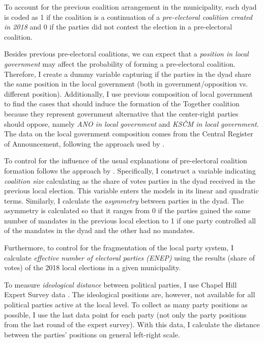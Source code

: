 \documentclass[]{interact}
\theoremstyle{plain}%
\theoremstyle{definition}
\theoremstyle{remark}
\begin{document}
To account for the previous coalition arrangement in the municipality, each dyad is coded as 1 if the coalition is a continuation of a \emph{pre-electoral coalition created in 2018} and 0 if the parties did not contest the election in a pre-electoral coalition. 

Besides previous pre-electoral coalitions, we can expect that a \emph{position in local government} may affect the probability of forming a pre-electoral coalition. Therefore, I create a dummy variable capturing if the parties in the dyad share the same position in the local government (both in government/opposition vs. different position). Additionally, I use previous composition of local government to find the cases that should induce the formation of the Together coalition because they represent government alternative that the center-right parties should oppose, namely \emph{ANO in local government} and \emph{KSČM in local government}. 
The data on the local government composition comes from the Central Register of Announcement, following the approach used by \citet{skvrnak2021}.

To control for the influence of the usual explanations of pre-electoral coalition formation follows the approach by \citet{golder2006}. Specifically, I construct a variable indicating \emph{coalition size} calculating as the share of votes parties in the dyad received in the previous local election. This variable enters the models in its linear and quadratic terms.
Similarly, I calculate the \emph{asymmetry} between parties in the dyad. The asymmetry is calculated so that it ranges from 0 if the parties gained the same number of mandates in the previous local election to 1 if one party controlled all of the mandates in the dyad and the other had no mandates.

Furthermore, to control for the fragmentation of the local party system, I calculate \emph{effective number of electoral parties (ENEP)} using the results (share of votes) of the 2018 local elections in a given municipality. 

To measure \emph{ideological distance} between political parties, I use Chapel Hill Expert Survey data \citep{jolly2022}. The ideological positions are, however, not available for all political parties active at the local level. To collect as many party positions as possible, I use the last data point for each party (not only the party positions from the last round of the expert survey). With this data, I calculate the distance between the parties' positions on general left-right scale. 
\end{document}
